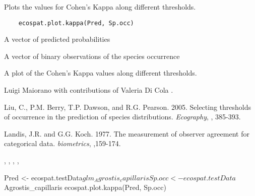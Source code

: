 \documentclass[a4paper]{book}
\begin{document}
%
\begin{Description}\relax
Plots the values for Cohen's Kappa along different thresholds.
\end{Description}
%
\begin{Usage}
\begin{verbatim}
    ecospat.plot.kappa(Pred, Sp.occ)
\end{verbatim}
\end{Usage}
%
\begin{Arguments}
\begin{ldescription}
\item[\code{Pred}] 
A vector of predicted probabilities

\item[\code{Sp.occ}] 
A vector of binary observations of the species occurrence

\end{ldescription}
\end{Arguments}
%
\begin{Value}
A plot of the Cohen's Kappa values along different thresholds.
\end{Value}
%
\begin{Author}\relax
Luigi Maiorano  with contributions of Valeria Di Cola .
\end{Author}
%
\begin{References}\relax
Liu, C., P.M. Berry, T.P. Dawson, and R.G. Pearson. 2005. Selecting thresholds of occurrence in the prediction of species distributions. \emph{Ecography}, , 385-393.

Landis, J.R. and G.G. Koch. 1977. The measurement of observer agreement for categorical data. \emph{biometrics}, ,159-174.

\end{References}
%
\begin{SeeAlso}\relax
{}, , , , 
\end{SeeAlso}
%
\begin{Examples}
\begin{ExampleCode}


Pred <- ecospat.testData$glm_Agrostis_capillaris
Sp.occ <- ecospat.testData$Agrostis_capillaris
ecospat.plot.kappa(Pred, Sp.occ)
\end{ExampleCode}
\end{Examples}
\end{document}

